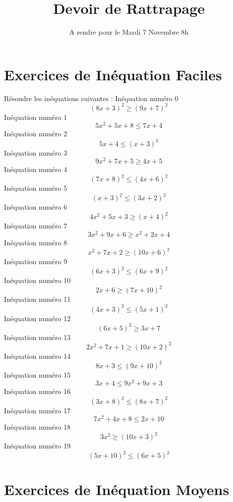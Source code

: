 \documentclass{article}
\title{Devoir de Rattrapage}
\date{A rendre pour le Mardi 7 Novembre 8h}\usepackage{natbib}
\begin{document}
\maketitle
 \section{Exercices de In\'equation Faciles}

 R\'esoudre les in\'equations suivantes : 
In\'equation num\'ero 0 \[\left(8 x + 3\right)^{2} \geq \left(9 x + 7\right)^{2}\]In\'equation num\'ero 1 \[5 x^{2} + 5 x + 8 \leq 7 x + 4\]In\'equation num\'ero 2 \[5 x + 4 \leq \left(x + 3\right)^{2}\]In\'equation num\'ero 3 \[9 x^{2} + 7 x + 5 \geq 4 x + 5\]In\'equation num\'ero 4 \[\left(7 x + 8\right)^{2} \leq \left(4 x + 6\right)^{2}\]In\'equation num\'ero 5 \[\left(x + 3\right)^{2} \leq \left(3 x + 2\right)^{2}\]In\'equation num\'ero 6 \[4 x^{2} + 5 x + 3 \geq \left(x + 4\right)^{2}\]In\'equation num\'ero 7 \[3 x^{2} + 9 x + 6 \geq x^{2} + 2 x + 4\]In\'equation num\'ero 8 \[x^{2} + 7 x + 2 \geq \left(10 x + 6\right)^{2}\]In\'equation num\'ero 9 \[\left(6 x + 3\right)^{2} \leq \left(6 x + 9\right)^{2}\]In\'equation num\'ero 10 \[2 x + 6 \geq \left(7 x + 10\right)^{2}\]In\'equation num\'ero 11 \[\left(4 x + 3\right)^{2} \leq \left(5 x + 1\right)^{2}\]In\'equation num\'ero 12 \[\left(6 x + 5\right)^{2} \geq 3 x + 7\]In\'equation num\'ero 13 \[2 x^{2} + 7 x + 1 \geq \left(10 x + 2\right)^{2}\]In\'equation num\'ero 14 \[8 x + 3 \leq \left(9 x + 10\right)^{2}\]In\'equation num\'ero 15 \[3 x + 4 \leq 9 x^{2} + 9 x + 3\]In\'equation num\'ero 16 \[\left(3 x + 8\right)^{2} \leq \left(8 x + 7\right)^{2}\]In\'equation num\'ero 17 \[7 x^{2} + 4 x + 8 \leq 2 x + 10\]In\'equation num\'ero 18 \[3 x^{2} \geq \left(10 x + 3\right)^{2}\]In\'equation num\'ero 19 \[\left(5 x + 10\right)^{2} \leq \left(6 x + 5\right)^{2}\]
 \section{Exercices de In\'equation Moyens}
\end{document}
